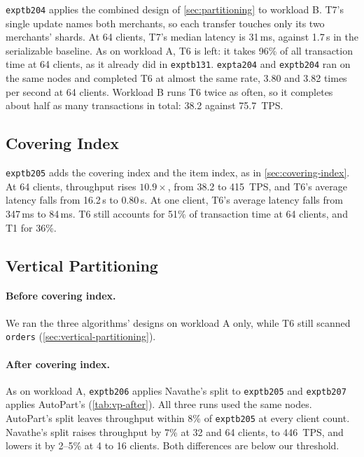 \documentclass[sigconf,10pt,nonacm]{acmart}
\newcommand{\expt}[1]{\texttt{expt\textunderscore #1}}
\renewcommand{\_}{\underscorewithoutbreak\allowbreak}
\begin{document}
\expt{b204} applies the combined design of \cref{sec:partitioning} to workload B. T7's
single update names both merchants, so each transfer touches only its two merchants'
shards. At 64 clients, T7's median latency is 31\,ms, against 1.7\,s in the
serializable baseline. As on workload A, T6 is left: it takes 96\% of all transaction
time at 64 clients, as it already did in \expt{b131}. \expt{a204} and \expt{b204} ran
on the same nodes and completed T6 at almost the same rate, 3.80 and 3.82 times per
second at 64 clients. Workload B runs T6 twice as often, so it completes about half as
many transactions in total: 38.2 against 75.7~TPS.

\subsection{Covering Index}
\label{sec:b-covering-index}

\expt{b205} adds the covering index and the item index, as in \cref{sec:covering-index}.
At 64 clients, throughput rises $10.9\times$, from 38.2 to 415~TPS, and T6's average
latency falls from 16.2\,s to 0.80\,s. At one client, T6's average latency falls from
347\,ms to 84\,ms. T6 still accounts for 51\% of transaction time at 64 clients, and
T1 for 36\%.

\subsection{Vertical Partitioning}
\label{sec:b-vertical-partitioning}

\paragraph{Before covering index.} We ran the three algorithms' designs on workload A
only, while T6 still scanned \texttt{orders} (\cref{sec:vertical-partitioning}).

\paragraph{After covering index.} As on workload A, \expt{b206} applies Navathe's split
to \expt{b205} and \expt{b207} applies AutoPart's (\cref{tab:vp-after}). All three runs
used the same nodes. AutoPart's split leaves throughput within 8\% of \expt{b205} at
every client count. Navathe's split raises throughput by 7\% at 32 and 64 clients, to
446~TPS, and lowers it by 2--5\% at 4 to 16 clients. Both differences are below our
threshold.
\end{document}
